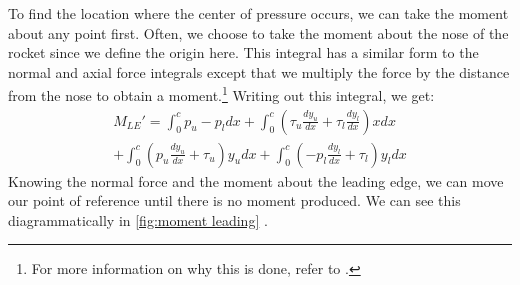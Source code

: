 \documentclass[10pt, openany, titlepage]{book}
\theoremstyle{definition}
\let\oldautoref\autoref
\renewcommand{\autoref}[1]{%
  \begingroup
  \hypersetup{linkcolor=black}%
  \oldautoref{#1}%
  \endgroup
}
\begin{document}
To find the location where the center of pressure occurs, we can take the moment about any point first. Often, we choose to take the moment about the nose of the rocket since we define the origin here. This integral has a similar form to the normal and axial force integrals except that we multiply the force by the distance from the nose to obtain a moment.\footnote{For more information on why this is done, refer to \cite{gundersen_understanding_2020}.} Writing out this integral, we get:
\begin{gather}
    M_{LE}'=\int_0^c{p_u-p_l}{dx}+\int_0^c{\left(\tau_u\frac{dy_u}{dx}+\tau_l\frac{dy_l}{dx}\right)}{xdx}\\+\int_0^c{\left(p_u\frac{dy_u}{dx}+\tau_u\right)}{y_udx}+\int_0^c{\left(-p_l\frac{dy_l}{dx}+\tau_l\right)}{y_ldx}
\end{gather}
Knowing the normal force and the moment about the leading edge, we can move our point of reference until there is no moment produced. We can see this diagrammatically in \autoref{fig:moment leading}.
\end{document}
